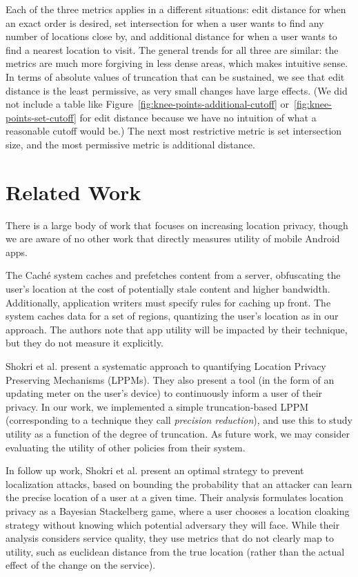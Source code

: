 \documentclass[10pt, conference, compsocconf]{IEEEtran}
\begin{document}
{Each of the three metrics applies in a different situations: edit
distance for when an exact order is desired, set intersection for when
a user wants to find any number of locations close by, and additional
distance for when a user wants to find a nearest location to visit.
The general trends for all three are similar: the metrics are much
more forgiving in less dense areas, which makes intuitive sense. In
terms of absolute values of truncation that can be sustained, we see
that edit distance is the least permissive, as very small changes have
large effects. (We did not include a table like
Figure~\ref{fig:knee-points-additional-cutoff}
or~\ref{fig:knee-points-set-cutoff} for edit distance because we have
no intuition of what a reasonable cutoff would be.) The next most
restrictive metric is set intersection size, and the most permissive
metric is additional distance.

\section{Related Work}

There is a large body of work that focuses on increasing location
privacy, though we are aware of no other work that directly measures
utility of mobile Android apps.

The Cach\'{e} system \cite{Amini:2010} caches and prefetches
content from a server, obfuscating the user's location at the cost of
potentially stale content and higher bandwidth.  Additionally,
application writers must specify rules for caching up front.  The
system caches data for a set of regions, quantizing the user's location 
as in our approach.  
The authors note that app utility will be impacted by their technique, 
but they do not measure it explicitly.

Shokri et al. \cite{Shokri:2011} present a systematic approach to
quantifying Location Privacy Preserving Mechanisms (LPPMs).  They also
present a tool (in the form of an updating meter on the user's device)
to continuously inform a user of their privacy.  In our work, we implemented a simple
truncation-based LPPM (corresponding to a technique they call
\emph{precision reduction}), and use this to study
utility as a function of the degree of truncation. As future work, we
may consider evaluating the utility of other policies from their
system.

In follow up work, Shokri et al. \cite{Shokri:2012} present an
optimal strategy to prevent localization attacks, based on bounding
the probability that an attacker can learn the
precise location of a user at a given time.  
Their analysis formulates location privacy as a Bayesian Stackelberg 
game, where a user chooses a location cloaking strategy without 
knowing which potential adversary they will face.
While their analysis considers service quality, they use metrics that do 
not clearly map to utility, such as euclidean distance from the 
true location (rather than the actual effect of the change on the service).

}
\end{document}
